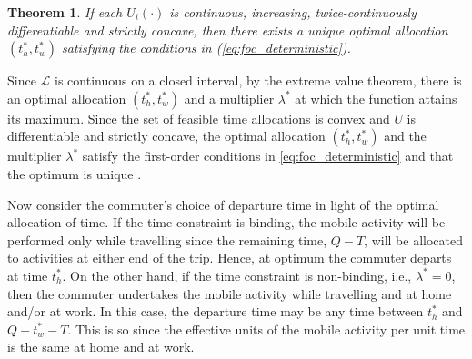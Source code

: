 \documentclass[12pt,a4paper,british]{article}
\makeatletter
\newenvironment{proof}[1][\proofname]{\par
    \normalfont\topsep6\p@\@plus6\p@\relax
    \trivlist
    \itemindent\parindent
    \item[\hskip\labelsep
          \scshape
      #1]\ignorespaces
  }{%
    \endtrivlist\@endpefalse
  }
\providecommand{\proofname}{Proof}
\newtheorem{theorem}{Theorem}[section]
\makeatother
\begin{document}
\begin{theorem}
\label{thm:optimum_det}
If each $U_{i}\left(\cdot\right)$ is continuous, increasing, twice-continuously differentiable and strictly concave, then there exists a unique optimal allocation $\left( t_{h}^{\ast}, t_{w}^{\ast} \right)$ satisfying the conditions in (\ref{eq:foc_deterministic}).
\end{theorem}

\begin{proof}
Since $\mathcal{L}$ is continuous on a closed interval, by the extreme value theorem, there is an optimal allocation $\left(t_{h}^{\ast},t_{w}^{\ast}\right)$ and a multiplier $\lambda^{\ast}$ at which the function attains its maximum. Since the set of feasible time allocations is convex and $U$ is differentiable and strictly concave, the optimal allocation  $\left(t_{h}^{\ast},t_{w}^{\ast}\right)$ and the multiplier $\lambda^{\ast} $ satisfy the first-order conditions in \eqref{eq:foc_deterministic} and that the optimum is unique \citep[Theorem 1.19 and Theorem 1.20 in][]{delaFuente2000MathematicalMethodsModels}.
\end{proof}

Now consider the commuter's choice of departure time in light of the optimal allocation of time. If the time constraint is binding, the mobile activity will be performed only while travelling since the remaining time, $Q-T$, will be allocated to activities at either end of the trip. Hence, at optimum the commuter departs at time $t_{h}^{\ast}$. On the other hand, if the time constraint is non-binding, i.e., $\lambda^{\ast}=0$, then the commuter undertakes the mobile activity while travelling and at home and/or at work. In this case, the departure time may be any time between $t_{h}^{\ast}$ and $Q-t_{w}^{\ast}-T$. This is so since the effective units of the mobile activity per unit time is the same at home and at work.

\end{document}
